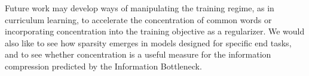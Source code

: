 Future work may develop ways of manipulating the training regime, as in curriculum learning, to accelerate the concentration of common words or incorporating concentration into the training objective as a regularizer. 
We would also like to see how sparsity emerges in models designed for specific end tasks, and to see whether concentration is a useful measure for the information compression predicted by the Information Bottleneck.

